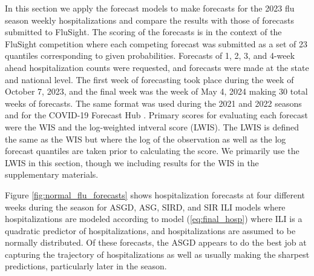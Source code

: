 In this section we apply the forecast models to make forecasts for the 2023 
flu season weekly hospitalizations and compare the results with those of 
forecasts submitted to FluSight. The scoring of the forecasts is in the 
context of the FluSight competition where each competing forecast was 
submitted as a set of 23 quantiles corresponding to given probabilities.
Forecasts of 1, 2, 3, and 4-week ahead hospitalization counts were requested, 
and forecasts were made at the state and national level. The first week of 
forecasting took place during the week of October 7, 2023, and the final week 
was the week of May 4, 2024 making 30 total weeks of forecasts.
 The same format was used during the 2021 and 2022 seasons and for the 
 COVID-19 Forecast Hub \cite[]{mathis2024evaluation, bracher2021evaluating}. 
 Primary scores for evaluating each forecast were the WIS and the 
 log-weighted intveral score (LWIS). The LWIS is defined the same as the WIS
 but where the log of the observation as well as the 
 log forecast quantiles are taken
 prior to calculating the score. We primarily use the LWIS in this section,
 though we including results for the WIS in the 
 supplementary materials.
 

Figure \ref{fig:normal_flu_forecasts} shows hospitalization forecasts at 
four different weeks during the season for ASGD, ASG, SIRD, and SIR ILI models
where hospitalizations are modeled according to model (\ref{eq:final_hosp})
where ILI is a quadratic predictor of hospitalizations, and hospitalizations
are assumed to be normally distributed. Of these forecasts, the ASGD appears 
to do the best job at capturing the trajectory of hospitalizations as well
as usually making the sharpest predictions, particularly later in the season. 

